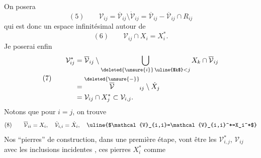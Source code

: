 On posera 
\[
(5)\qquad \mathcal{V}_{ij}=\overline{\mathcal{V}}_{ij}\setminus\dot{\mathcal{V}}_{ij}=\overline{\mathcal{V}}_{ij}-\overline{\mathcal{V}}_{ij}\cap R_{ij}
\]
qui est donc un espace infinitésimal autour de
\[
(6)\qquad \mathcal{V}_{ij}\cap X_i=X_i^*.
\]
Je poserai enfin
\[
(7)\qquad\begin{aligned}
\mathcal{V}_{ij}^*&=\overline{\mathcal{V}}_{ij}\setminus\bigcup_{\deleted{\unsure{i}}\,\uline{$k$}<j}X_k\cap\overline{\mathcal{V}}_{ij}\\
&=\overset{\deleted{\unsure{-}}}{\overline{\mathcal{V}}}_{ij}\setminus\dot X_j\\
&=\mathcal{V}_{ij}\cap X_j^*\subset\mathcal{V}_{i,j}.
\end{aligned}
\]
Notons que pour $i=j$, on trouve
\[
(8)\qquad\overline{\mathcal{V}}_{ii}=X_i,\quad\dot{\mathcal{V}}_{i,i}=\dot X_i,\quad\uline{$\mathcal{V}_{i,i}=\mathcal{V}_{i,i}^*=X_i^*$}
\]
Nos ``pierres'' de construction, dans une première étape, vont être les $\mathcal{V}_{i,j}^*$, $\mathcal{V}_{ij}$ avec les inclusions incidentes
,
ces pierres   $X_i^*$ comme
